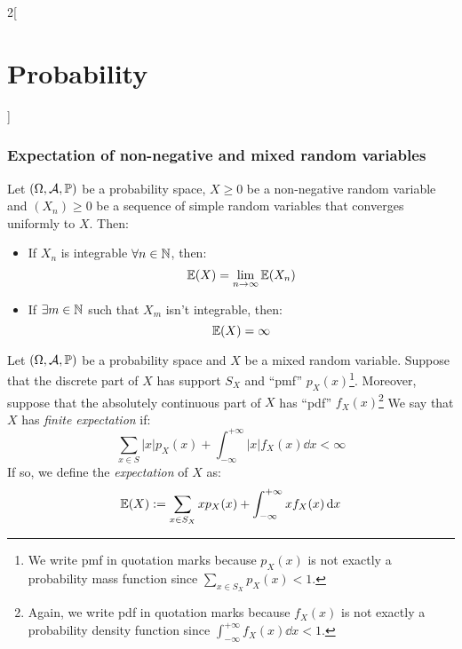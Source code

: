\documentclass[../../../main.tex]{subfiles}
\begin{document}
\begin{multicols}{2}[\section{Probability}]
  \subsubsection{Expectation of non-negative and mixed random variables}
  \begin{proposition}
    Let $(\Omega,\mathcal{A},\mathbb{P})$ be a probability space, $X\geq 0$ be a non-negative random variable and $(X_n)\geq 0$ be a sequence of simple random variables that converges uniformly to $X$. Then:
    \begin{itemize}
      \item If $X_n$ is integrable $\forall n\in\mathbb{N}$, then: $$\mathbb{E}(X)=\lim_{n\to\infty}\mathbb{E}(X_n)$$
      \item If $\exists m\in\mathbb{N}$ such that $X_m$ isn't integrable, then: $$\mathbb{E}(X)=\infty$$
    \end{itemize}
  \end{proposition}
  \begin{definition}
    Let $(\Omega,\mathcal{A},\mathbb{P})$ be a probability space and $X$ be a mixed random variable. Suppose that the discrete part of $X$ has support $S_X$ and ``pmf'' $p_X(x)$\footnote{We write pmf in quotation marks because $p_X(x)$ is not exactly a probability mass function since $\sum_{x\in S_X}p_X(x)<1$.}. Moreover, suppose that the absolutely continuous part of $X$ has ``pdf'' $f_X(x)$\footnote{Again, we write pdf in quotation marks because $f_X(x)$ is not exactly a probability density function since $\int_{-\infty}^{+\infty}f_X(x)\dd{x}<1$.} We say that $X$ has \emph{finite expectation} if: $$\sum_{x\in S}|x|p_X(x)+\int_{-\infty}^{+\infty}|x|f_X(x)\dd{x}<\infty$$
    If so, we define the \emph{expectation} of $X$ as: $$\mathbb{E}(X):=\sum_{x\in S_X}xp_X(x)+\int_{-\infty}^{+\infty}xf_X(x)\dd{x}$$
  \end{definition}

\end{multicols}
\end{document}
